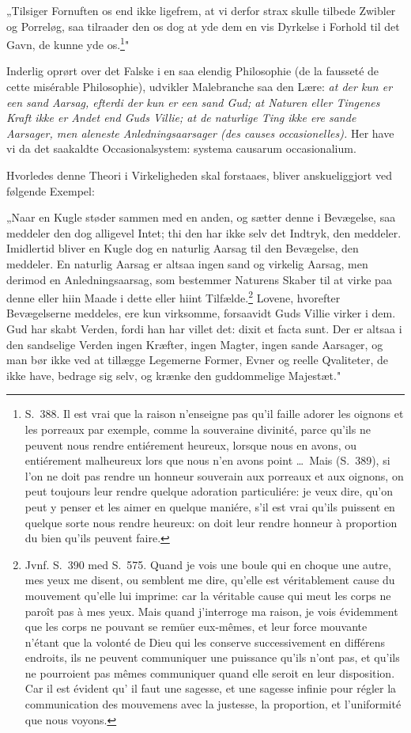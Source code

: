 \documentclass[12pt,a4paper]{article}
\newcommand{\opage}[1]{\marginnote{\footnotesize\textit{[#1]}}}
\begin{document}
„Tilsiger Fornuften os end ikke ligefrem, at vi derfor strax skulle tilbede
Zwibler og Porreløg, saa tilraader den os dog at yde dem en vis Dyrkelse i
Forhold til det Gavn, de kunne yde os.\footnote{S.~388. Il est vrai que la raison
n'enseigne pas qu'il faille adorer les oignons et les porreaux par exemple, comme
la souveraine divinité, parce qu'ils ne peuvent nous rendre entiérement heureux,
lorsque nous en avons, ou entiérement malheureux lors que nous n'en avons point
\dots\ Mais (S.~389), si l'on ne doit pas rendre un honneur souverain aux
porreaux et aux oignons, on peut toujours leur rendre quelque adoration
particuliére: je veux dire, qu'on peut y penser et les aimer en quelque maniére,
s'il est vrai qu'ils puissent en quelque sorte nous rendre heureux: on doit leur
rendre honneur à proportion du bien qu'ils peuvent faire.}"

Inderlig oprørt over det Falske i en saa elendig Philosophie (de la fausseté de
cette misérable Philosophie), udvikler Malebranche saa den Lære:
\emph{at der kun er een sand Aarsag, efterdi der kun er een sand Gud; at Naturen
eller Tingenes Kraft ikke er Andet end Guds Villie; at de naturlige Ting ikke ere
sande Aarsager, men aleneste Anledningsaarsager (des causes occasionelles).}
\opage{21} Her have vi da det saakaldte Occasionalsystem: systema causarum occasionalium.

Hvorledes denne Theori i Virkeligheden skal forstaaes, bliver anskueliggjort ved
følgende Exempel:

„Naar en Kugle støder sammen med en anden, og sætter denne i Bevægelse, saa
meddeler den dog alligevel Intet; thi den har ikke selv det Indtryk, den
meddeler. Imidlertid bliver en Kugle dog en naturlig Aarsag til den Bevægelse,
den meddeler. En naturlig Aarsag er altsaa ingen sand og virkelig Aarsag, men
derimod en Anledningsaarsag, som bestemmer Naturens Skaber til at virke paa denne
eller hiin Maade i dette eller hiint Tilfælde.\footnote{Jvnf. S.~390 med S.~575.
Quand je vois une boule qui en choque une autre, mes yeux me disent, ou semblent
me dire, qu'elle est véritablement cause du mouvement qu'elle lui imprime: car la
véritable cause qui meut les corps ne paroît pas à mes yeux. Mais quand
j'interroge ma raison, je vois évidemment que les corps ne pouvant se remüer
eux-mêmes, et leur force mouvante n'étant que la volonté de Dieu qui les conserve
successivement en différens endroits, ils ne peuvent communiquer une puissance
qu'ils n'ont pas, et qu'ils ne pourroient pas mêmes communiquer quand elle seroit
en leur disposition. Car il est évident qu' il faut une sagesse, et une sagesse
infinie pour régler la communication des mouvemens avec la justesse, la
proportion, et l'uniformité que nous voyons.} Lovene, hvorefter Bevægelserne
meddeles, ere kun virksomme, forsaavidt Guds Villie virker i dem. Gud har skabt
Verden, fordi han har villet det: dixit et facta sunt. Der er altsaa i den
sandselige Verden ingen Kræfter, ingen Magter, ingen sande Aarsager, og man bør
ikke ved at tillægge Legemerne Former, Evner og reelle Qvaliteter, de ikke have,
bedrage sig selv, og krænke den guddommelige Majestæt."
\end{document}
